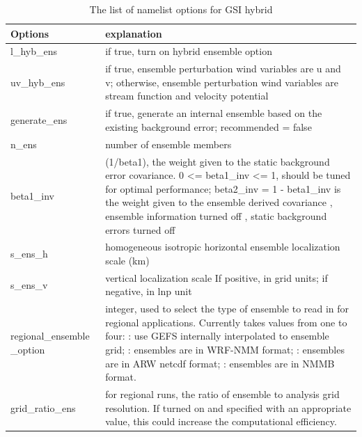 \begin{itemize}[leftmargin=*]
\begin{table}[htbp]
\centering
\caption{The list of namelist options for GSI hybrid}
\begin{tabular}{|p{3cm}|p{11cm}|}
\hline
Options & explanation \\
\hline
l\_hyb\_ens &  if true, turn on hybrid ensemble option \\
\hline
uv\_hyb\_ens & if true, ensemble perturbation wind variables are u and v; \newline
otherwise, ensemble perturbation wind variables are stream function and velocity potential \\
\hline
generate\_ens &  if true, generate an internal ensemble based on the existing background error; recommended = false \\
\hline
n\_ens &  number of ensemble members \\
\hline
beta1\_inv& (1/beta1), the weight given to the static background error covariance. 0 <= beta1\_inv <= 1, should be tuned for optimal performance; beta2\_inv = 1 - beta1\_inv is the weight given to the ensemble derived covariance \newline
=1, ensemble information turned off \newline
=0, static background errors turned off \\
\hline
s\_ens\_h & homogeneous isotropic horizontal ensemble localization scale (km) \\
\hline
s\_ens\_v &  vertical localization scale \newline
If positive, in grid units; \newline
if negative, in lnp unit \\
\hline
regional\_ensemble\newline
\_option & integer, used to select the type of ensemble to read in for regional applications. Currently takes values from one to four: \newline
	=1: use GEFS internally interpolated to ensemble grid; \newline
	=2: ensembles are in WRF-NMM format; \newline
	=3: ensembles are in ARW netcdf format; \newline
	=4: ensembles are in NMMB format. \\
\hline
grid\_ratio\_ens & for regional runs, the ratio of ensemble to analysis grid resolution. If turned on and specified with an appropriate value, this could increase the computational efficiency. \\
\hline
\end{tabular}
\label{tab52}
\end{table} 


\end{itemize}
